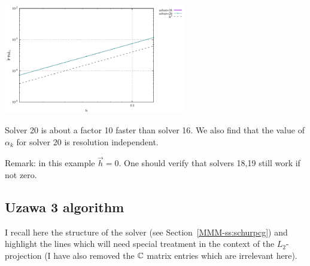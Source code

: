 \begin{center}
\includegraphics[width=8cm]{python_codes/fieldstone_147/RESULTS/L2/uzawa2/errorsP.pdf}
\end{center}

Solver 20 is about a factor 10 faster than solver 16.
We also find that the value of $\alpha_k$ for solver 20 is resolution independent.

Remark: in this example $\vec{h}=0$. One should verify that solvers 18,19 still work if not zero.

\subsection*{Uzawa 3 algorithm}

I recall here the structure of the solver (see Section~\ref{MMM-ss:schurpcg})
and highlight the lines which will need special treatment in the context of the $L_2$-projection
(I have also removed the ${\mathbb{C}}$ matrix entries which are irrelevant here).

